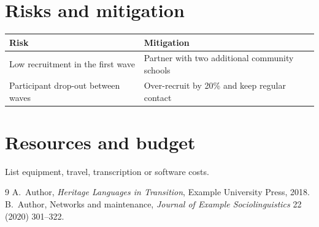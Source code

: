 \documentclass[11pt,a4paper]{article}
\begin{document}
\section{Risks and mitigation}
\begin{tabularx}{\linewidth}{@{}>{\raggedright\arraybackslash}X>{\raggedright\arraybackslash}X@{}}
\toprule
Risk & Mitigation \\
\midrule
Low recruitment in the first wave & Partner with two additional community schools \\
Participant drop-out between waves & Over-recruit by 20\% and keep regular contact \\
\bottomrule
\end{tabularx}

\section{Resources and budget}
List equipment, travel, transcription or software costs.

\begin{thebibliography}{9}
 A.~Author, \emph{Heritage Languages in Transition}, Example University Press, 2018.
 B.~Author, Networks and maintenance, \emph{Journal of Example Sociolinguistics} 22 (2020) 301--322.
\end{thebibliography}
\end{document}
